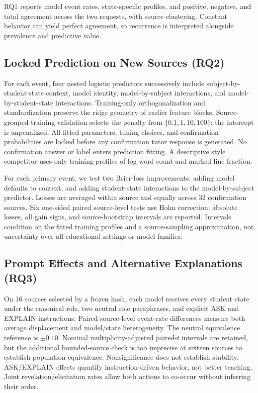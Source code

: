 RQ1 reports model event rates, state-specific profiles, and positive, negative,
and total agreement across the two requests, with source clustering. Constant
behavior can yield perfect agreement, so recurrence is interpreted alongside
prevalence and predictive value.

\subsection{Locked Prediction on New Sources (RQ2)}

For each event, four nested logistic predictors successively include
subject-by-student-state context, model identity, model-by-subject interactions,
and model-by-student-state interactions. Training-only orthogonalization and
standardization preserve the ridge geometry of earlier feature blocks.
Source-grouped training validation selects the penalty from
$\{0.1,1,10,100\}$; the intercept is unpenalized. All fitted parameters, tuning
choices, and confirmation probabilities are locked before any confirmation
tutor response is generated. No confirmation answer or label enters prediction
fitting. A descriptive style competitor uses only training profiles of log word
count and marked-line fraction.

For each primary event, we test two Brier-loss improvements: adding model
defaults to context, and adding student-state interactions to the
model-by-subject predictor. Losses are averaged within source and equally
across 32 confirmation sources. Six one-sided paired source-level tests use
Holm correction; absolute losses, all gain signs, and source-bootstrap intervals
are reported. Intervals condition on the fitted training profiles and a
source-sampling approximation, not uncertainty over all educational settings
or model families.

\subsection{Prompt Effects and Alternative Explanations (RQ3)}

On 16 sources selected by a frozen hash, each model receives every student state
under the canonical role, two neutral role paraphrases, and explicit ASK and
EXPLAIN instructions. Paired source-level event-rate differences measure both
average displacement and model/state heterogeneity. The neutral equivalence
reference is $\pm0.10$. Nominal multiplicity-adjusted paired-$t$ intervals are
retained, but the additional bounded-source check is too imprecise at sixteen
sources to establish population equivalence. Nonsignificance does not establish
stability. ASK/EXPLAIN effects quantify instruction-driven behavior, not better
teaching. Joint revelation/elicitation rates allow both actions to co-occur
without inferring their order.

